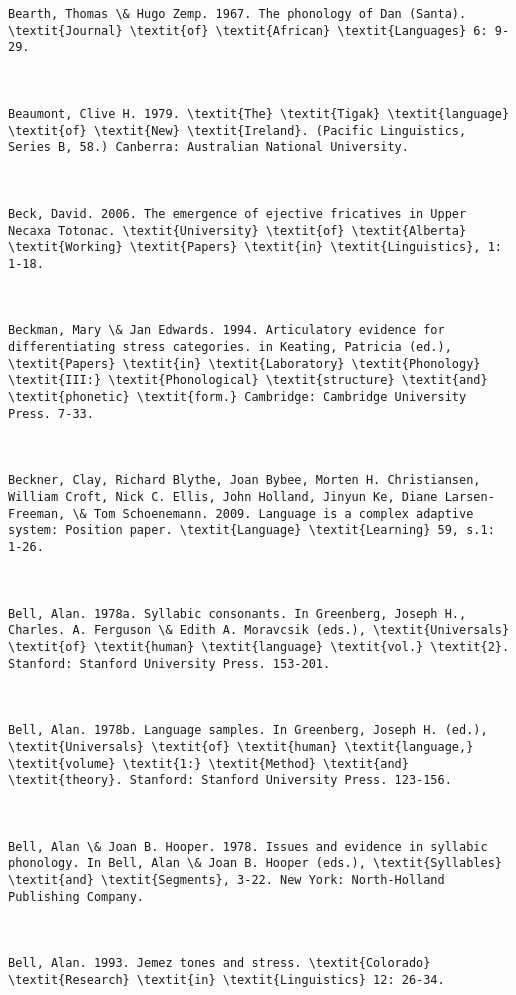 \begin{verbatim}
Bearth, Thomas \& Hugo Zemp. 1967. The phonology of Dan (Santa). \textit{Journal} \textit{of} \textit{African} \textit{Languages} 6: 9-29.



Beaumont, Clive H. 1979. \textit{The} \textit{Tigak} \textit{language} \textit{of} \textit{New} \textit{Ireland}. (Pacific Linguistics, Series B, 58.) Canberra: Australian National University.



Beck, David. 2006. The emergence of ejective fricatives in Upper Necaxa Totonac. \textit{University} \textit{of} \textit{Alberta} \textit{Working} \textit{Papers} \textit{in} \textit{Linguistics}, 1: 1-18.



Beckman, Mary \& Jan Edwards. 1994. Articulatory evidence for differentiating stress categories. in Keating, Patricia (ed.), \textit{Papers} \textit{in} \textit{Laboratory} \textit{Phonology} \textit{III:} \textit{Phonological} \textit{structure} \textit{and} \textit{phonetic} \textit{form.} Cambridge: Cambridge University Press. 7-33.



Beckner, Clay, Richard Blythe, Joan Bybee, Morten H. Christiansen, William Croft, Nick C. Ellis, John Holland, Jinyun Ke, Diane Larsen-Freeman, \& Tom Schoenemann. 2009. Language is a complex adaptive system: Position paper. \textit{Language} \textit{Learning} 59, s.1: 1-26.



Bell, Alan. 1978a. Syllabic consonants. In Greenberg, Joseph H., Charles. A. Ferguson \& Edith A. Moravcsik (eds.), \textit{Universals} \textit{of} \textit{human} \textit{language} \textit{vol.} \textit{2}. Stanford: Stanford University Press. 153-201.



Bell, Alan. 1978b. Language samples. In Greenberg, Joseph H. (ed.), \textit{Universals} \textit{of} \textit{human} \textit{language,} \textit{volume} \textit{1:} \textit{Method} \textit{and} \textit{theory}. Stanford: Stanford University Press. 123-156.



Bell, Alan \& Joan B. Hooper. 1978. Issues and evidence in syllabic phonology. In Bell, Alan \& Joan B. Hooper (eds.), \textit{Syllables} \textit{and} \textit{Segments}, 3-22. New York: North-Holland Publishing Company.



Bell, Alan. 1993. Jemez tones and stress. \textit{Colorado} \textit{Research} \textit{in} \textit{Linguistics} 12: 26-34.




\end{verbatim}
